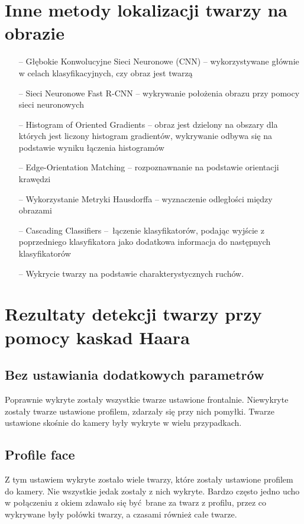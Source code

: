 \documentclass[a4paper, 12pt, titlepage]{article}
\begin{document}
    \section{Inne metody lokalizacji twarzy na obrazie}
        \begin{itemize}
            \item[--] Głębokie Konwolucyjne Sieci Neuronowe (CNN) -- 
                wykorzystywane głównie w celach klasyfikacyjnych, czy obraz
                jest twarzą
            \item[--] Sieci Neuronowe Fast R-CNN -- wykrywanie położenia obrazu
                przy pomocy sieci neuronowych
            \item[--] Histogram of Oriented Gradients -- obraz jest dzielony
                na obszary dla których jest liczony histogram gradientów, 
                wykrywanie odbywa się na podstawie wyniku łączenia histogramów
            \item[--] Edge-Orientation Matching -- rozpoznawnanie na podstawie
                orientacji krawędzi
            \item[--] Wykorzystanie Metryki Hausdorffa -- wyznaczenie odległości
                między obrazami
            \item[--] Cascading Classifiers -- łączenie klasyfikatorów,
                podając wyjście z poprzedniego klasyfikatora jako dodatkowa
                informacja do następnych klasyfikatorów
            \item[--] Wykrycie twarzy na podstawie charakterystycznych ruchów.
        \end{itemize}
    \section{Rezultaty detekcji twarzy przy pomocy kaskad Haara}
        \subsection{Bez ustawiania dodatkowych parametrów}
            Poprawnie wykryte zostały wszystkie twarze ustawione frontalnie.
            Niewykryte zostały twarze ustawione profilem, zdarzały się przy 
            nich pomyłki. Twarze ustawione skośnie do kamery były wykryte w
            wielu przypadkach.
        \subsection{Profile face}
            Z tym ustawiem wykryte zostało wiele twarzy, które zostały
            ustawione profilem do kamery. Nie wszystkie jedak zostaly z nich 
            wykryte. Bardzo często jedno ucho w połączeniu z okiem zdawało się
            być brane za twarz z profilu, przez co wykrywane były połówki
            twarzy, a czasami również całe twarze.
\end{document}
